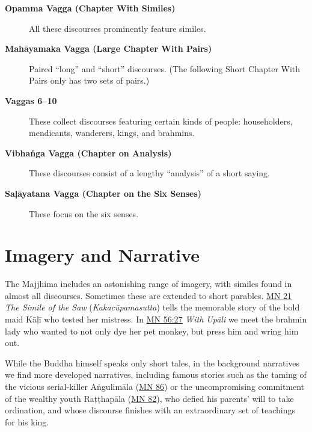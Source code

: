 \documentclass[12pt,openany]{book}%
\begin{document}
\begin{description}%
\item[\textbf{Opamma Vagga (Chapter With Similes)}] All these discourses prominently feature similes.%
\item[\textbf{\textsanskrit{Mahāyamaka} Vagga (Large Chapter With Pairs)}] Paired “long” and “short” discourses. (The following Short Chapter With Pairs only has two sets of pairs.)%
\item[\textbf{Vaggas 6–10}] These collect discourses featuring certain kinds of people: householders, mendicants, wanderers, kings, and brahmins.%
\item[\textbf{\textsanskrit{Vibhaṅga} Vagga (Chapter on Analysis)}] These discourses consist of a lengthy “analysis” of a short saying.%
\item[\textbf{\textsanskrit{Saḷāyatana} Vagga (Chapter on the Six Senses)}] These focus on the six senses.%
\end{description}

\section*{Imagery and Narrative}

The Majjhima includes an astonishing range of imagery, with similes found in almost all discourses. Sometimes these are extended to short parables. \href{https://suttacentral.net/mn21}{MN 21} \textit{The Simile of the Saw} (\textit{\textsanskrit{Kakacūpamasutta}}) tells the memorable story of the bold maid \textsanskrit{Kāḷī} who tested her mistress. In \href{https://suttacentral.net/mn56\#27}{MN 56:27} \textit{With \textsanskrit{Upāli}} we meet the brahmin lady who wanted to not only dye her pet monkey, but press him and wring him out.

While the Buddha himself speaks only short tales, in the background narratives we find more developed narratives, including famous stories such as the taming of the vicious serial-killer \textsanskrit{Aṅgulimāla} (\href{https://suttacentral.net/mn86}{MN 86}) or the uncompromising commitment of the wealthy youth \textsanskrit{Raṭṭhapāla} (\href{https://suttacentral.net/mn82}{MN 82}), who defied his parents’ will to take ordination, and whose discourse finishes with an extraordinary set of teachings for his king.
\end{document}
